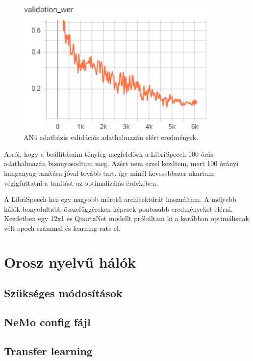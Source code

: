 \begin{figure}[!ht]
\centering
\includegraphics[width=100mm, keepaspectratio]{figures/an4_wer.png}
\caption{AN4 adatbázis validációs adathalmazán elért eredmények.}
\label{fig:TeXstudio}
\end{figure}

Arról, hogy a beállításaim tényleg megfelelőek a LibriSpeech 100 órás adathalmazán bizonyosodtam meg. Azért nem ezzel kezdtem, mert 100 órányi hanganyag tanítása jóval tovább tart, így minél kevesebbszer akartam végigfuttatni a tanítást az optimalizálás érdekében.

A LibriSpeech-hez egy nagyobb méretű architektúrát használtam. A mélyebb hálók bonyolultabb összefüggéseken képesek pontosabb eredményeket elérni. Kezdetben egy 12x1 es QuartzNet modellt próbáltam ki a korábban optimálisnak vélt epoch számmal és learning rate-el.

\section{Orosz nyelvű hálók}

\subsection{Szükséges módosítások}

\subsection{NeMo config fájl}

\subsection{Transfer learning}